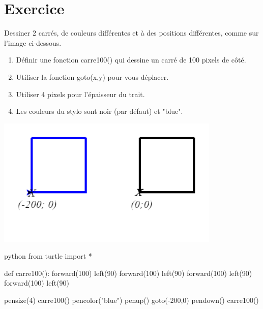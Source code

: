 \documentclass[a4paper,11pt]{article}
\begin{document}
\section{Exercice}
Dessiner 2 carrés, de couleurs différentes et à des positions différentes, comme sur l'image ci-dessous.
\begin{multicols}{2}
\begin{enumerate}
\item Définir une fonction carre100() qui dessine un carré de 100 pixels de côté.
\item Utiliser la fonction goto(x,y) pour vous déplacer.
\item Utiliser 4 pixels pour l'épaisseur du trait.
\item Les couleurs du stylo sont noir (par défaut) et "blue".
\end{enumerate}
\begin{center}
\includegraphics[width=0.8\textwidth]{images/TurtleCarres.png}\\
\end{center}
\end{multicols}

\begin{solution}
\begin{code}{python}
from turtle import *

def carre100():
    forward(100)
    left(90)
    forward(100)
    left(90)
    forward(100)
    left(90)
    forward(100)
    left(90)

pensize(4)
carre100()
pencolor("blue")
penup()
goto(-200,0)
pendown()
carre100()
\end{code}
\end{solution}
\end{document}
